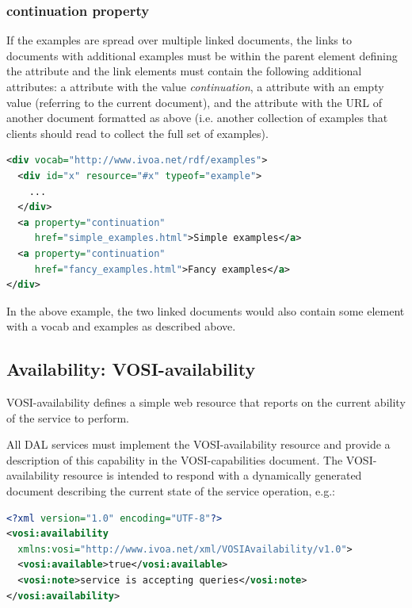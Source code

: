 \documentclass[11pt,letter]{ivoa}
\begin{document}
\subsubsection{continuation property}

If the examples are spread over multiple linked documents, the links to 
documents with additional examples must be within the parent element defining 
the  attribute and the link elements must contain the following additional 
attributes:  a  attribute with the value
\emph{continuation}, a 
attribute with an empty value (referring to the current document), and
the 
attribute with the URL of another document formatted as above (i.e. another 
collection of examples that clients should read to collect the full set of 
examples).

\begin{lstlisting}[language=XML,basicstyle=\footnotesize]
<div vocab="http://www.ivoa.net/rdf/examples">
  <div id="x" resource="#x" typeof="example">
    ...
  </div>
  <a property="continuation"
     href="simple_examples.html">Simple examples</a>
  <a property="continuation"
     href="fancy_examples.html">Fancy examples</a>
</div>
\end{lstlisting}

In the above example, the two linked documents would also contain some element 
with a vocab and examples as described above. 

\subsection{Availability: VOSI-availability}
\label{sec:vosi-availability}
VOSI-availability \citep{std:VOSI} defines a simple web resource that 
reports on the current ability of the service to perform. 

All DAL services must implement the VOSI-availability resource and provide a description
of this capability in the VOSI-capabilities document. The VOSI-availability resource is
intended to respond with a dynamically generated document describing the current state of the service 
operation, e.g.:

\begin{lstlisting}[language=XML,basicstyle=\footnotesize]
<?xml version="1.0" encoding="UTF-8"?>
<vosi:availability  
  xmlns:vosi="http://www.ivoa.net/xml/VOSIAvailability/v1.0">
  <vosi:available>true</vosi:available>
  <vosi:note>service is accepting queries</vosi:note>
</vosi:availability>
\end{lstlisting}
\end{document}
